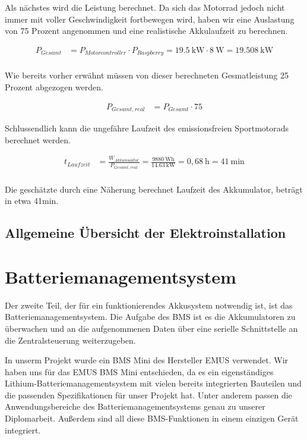 Als nächstes wird die Leistung berechnet. Da sich das Motorrad jedoch nicht immer mit voller Geschwindigkeit fortbewegen wird, haben wir eine Auslastung von 75 Prozent angenommen und eine realistische Akkulaufzeit zu berechnen.

\begin{align*}
P_{Gesamt} &= P_{Motorcontroller} \cdot P_{Raspberry} = 19.5~\mathrm{kW} \cdot 8~\mathrm{W} = 19.508~\mathrm{kW}\\
\end{align*}

Wie bereits vorher erwähnt müssen von dieser berechneten Gesmatleistung 25 Prozent abgezogen werden.

\begin{align*}
P_{Gesamt,real} &= P_{Gesamt} \cdot 75%
\end{align*}

Schlussendlich kann die ungefähre Laufzeit des emissionsfreien Sportmotorads berechnet werden.

\begin{align*}
t_{Laufzeit} &= \frac{W_{Akkumualtor}}{P_{Gesamt,real}} = \frac{9880~\mathrm{Wh}}{14.63~\mathrm{kW}} = 0,68~\mathrm{h} = 41~\mathrm{min}\\
\end{align*}

Die geschätzte durch eine Näherung berechnet Laufzeit des Akkumulator, beträgt in etwa 41min.

\subsection{Allgemeine Übersicht der Elektroinstallation}
\newpage
\section{Batteriemanagementsystem}
Der zweite Teil, der für ein funktionierendes Akkusystem notwendig ist, ist das Batteriemanagementsystem. Die Aufgabe des BMS ist es die Akkumulatoren zu überwachen und an die aufgenommenen Daten über eine serielle Schnittstelle an die Zentralsteuerung weiterzugeben. 

In unserm Projekt wurde ein BMS Mini des Hersteller EMUS verwendet. Wir haben uns für das EMUS BMS Mini entschieden, da es ein eigenständiges Lithium-Batteriemanagementsystem mit vielen bereits integrierten Bauteilen und die passenden Spezifikationen für unser Projekt hat. Unter anderem passen die Anwendungsbereiche des Batteriemanagementsystems genau zu unserer Diplomarbeit. Außerdem sind all diese BMS-Funktionen in einem einzigen Gerät integriert. 

